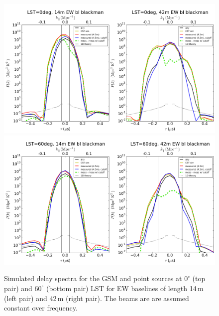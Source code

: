 \documentclass[preprint]{aastex}
\begin{document}
\begin{figure}[h]
\includegraphics[width=6.7in]{LST0deg_14m_42m_EWbaselines_dish1_blackman.png}
\includegraphics[width=6.7in]{LST60deg_14m_42m_EWbaselines_dish1_blackman.png}
\caption{Simulated delay spectra for the GSM and point sources at $0^\circ$ (top pair) and $60^\circ$ (bottom pair) LST for EW baselines of length 14\,m (left pair) and 42\,m (right pair). The beams are are assumed constant over frequency.}
\label{fig:delayspec}
\end{figure}
\end{document}
